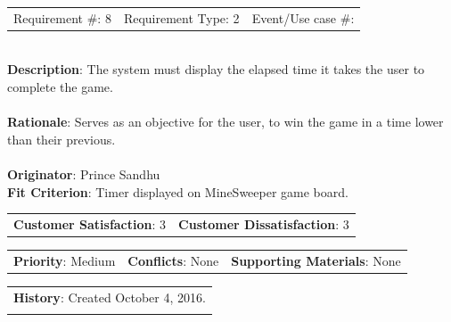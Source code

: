 \documentclass[12pt, titlepage]{article}
\begin{document}
\begin{reqbox}

\begin{tabular}{lll}
Requirement \#: 8 & Requirement Type: 2 & Event/Use case \#: \\
\end{tabular} \\

\textbf{Description}: The system must display the elapsed time it takes the user to complete the game. \\ \\
\textbf{Rationale}: Serves as an objective for the user, to win the game in a time lower than their previous. \\ \\
\textbf{Originator}: Prince Sandhu \\
\textbf{Fit Criterion}: Timer displayed on MineSweeper game board. \\

\begin{tabular}{ll}
\textbf{Customer Satisfaction}: 3 & \textbf{Customer Dissatisfaction}: 3 \\
\end{tabular}

\begin{tabular}{lll}
\textbf{Priority}: Medium & \textbf{Conflicts}: None & \textbf{Supporting Materials}: None \\
\end{tabular}

\begin{tabular}{l}
\textbf{History}: Created October 4, 2016.\\ \\
\end{tabular} \\

\end{reqbox}
\newpage
\end{document}
